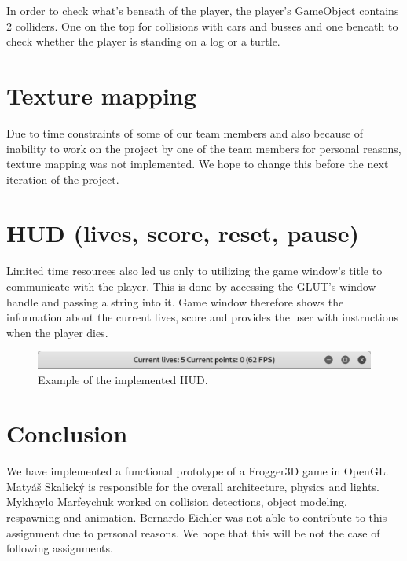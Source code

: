 \documentclass[a4paper,10pt]{article}
\begin{document}
In order to check what's beneath of the player, the player's GameObject contains 2 colliders. One on the top for collisions with cars and busses and one beneath to check whether the player is standing on a log or a turtle.

\section{Texture mapping}
Due to time constraints of some of our team members and also because of inability to work on the project by one of the team members for personal reasons, texture mapping was not implemented. We hope to change this before the next iteration of the project.

\section{HUD (lives, score, reset, pause)}
Limited time resources also led us only to utilizing the game window's title to communicate with the player. This is done by accessing the GLUT's window handle and passing a string into it. Game window therefore shows the information about the current lives, score and provides the user with instructions when the player dies.

\begin{figure}[!htb]
	\centering
  	\includegraphics[width=\linewidth]{images/image2.png}
  	\caption{Example of the implemented HUD.}
\end{figure}


\section{Conclusion}
We have implemented a functional prototype of a Frogger3D game in OpenGL. Matyáš Skalický is responsible for the overall architecture, physics and lights. Mykhaylo Marfeychuk worked on collision detections, object modeling, respawning and animation. Bernardo Eichler was not able to contribute to this assignment due to personal reasons. We hope that this will be not the case of following assignments.
\end{document}
